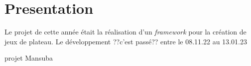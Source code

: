 \section*{Presentation}

Le projet de cette année était la réalisation d'un \emph{framework} pour la création de jeux de plateau.
Le développement ??c'est passé?? entre le 08.11.22 au 13.01.23

projet Mansuba
